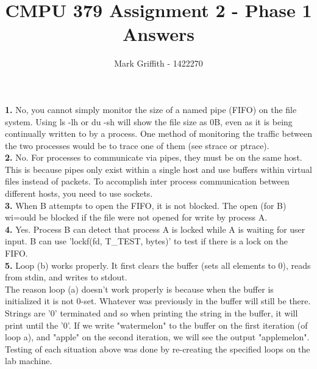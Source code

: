 \documentclass{article}
\begin{document}
\title{CMPU 379 Assignment 2 - Phase 1 Answers}
\author{Mark Griffith - 1422270}

\maketitle

\noindent
\textbf{1.} No, you cannot simply monitor the size
of a named pipe (FIFO) on the file system. Using
ls -lh or du -sh will show the file size as 0B,
even as it is being continually written to by
a process. One method of monitoring the traffic
between the two processes would be to trace one
of them (see strace or ptrace). \\

\noindent
\textbf{2.} No. For processes to communicate via
pipes, they must be on the same host. This
is because pipes only exist within a single
host and use buffers within virtual files
instead of packets. To accomplish inter
process communication between different hosts,
you need to use sockets. \\

\noindent
\textbf{3.} When B attempts to open the FIFO,
it is not blocked. The open (for B) wi=ould be blocked if the
file were not opened for write by process A.\\

\noindent
\textbf{4.} Yes. Process B can detect that
process A is locked while A is waiting for
user input. B can use 'lockf(fd, T\_TEST, bytes)'
to test if there is a lock on the FIFO. \\

\noindent
\textbf{5.}
Loop (b) works properly. It first clears the buffer (sets all
elements to 0), reads from stdin, and writes to stdout. \\

\noindent
The reason loop (a) doesn't work properly is because when the
buffer is initialized it is not 0-set. Whatever was
previously in the buffer will still be there. Strings are
'0' terminated and so when printing the string in the
buffer, it will print until the '0'. If we write
"watermelon" to the buffer on the first iteration (of loop a),
and "apple"
on the second iteration, we will see the output "applemelon". \\

\noindent
Testing of each situation above was done by re-creating the
specified loops on the lab machine.
\end{document}
